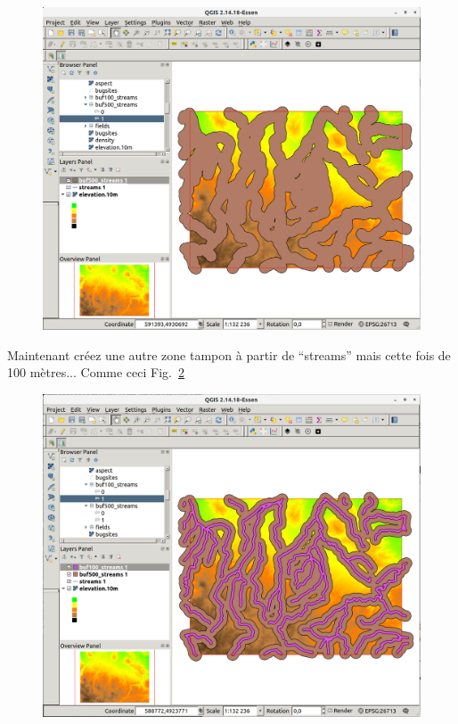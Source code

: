 \begin{figure}[htbp]
   \centering
   \includegraphics[scale=0.2]{qgis037.png}
   \caption{}
   \label{fig:qgis037}
\end{figure}

Maintenant cr\'eez une autre zone tampon \`a partir de ``streams'' mais cette fois de 100 m\`etres... Comme ceci Fig.~\ref{fig:qgis038}

\begin{figure}[htbp]
   \centering
   \includegraphics[scale=0.2]{qgis038.png}
   \caption{}
   \label{fig:qgis038}
\end{figure}

